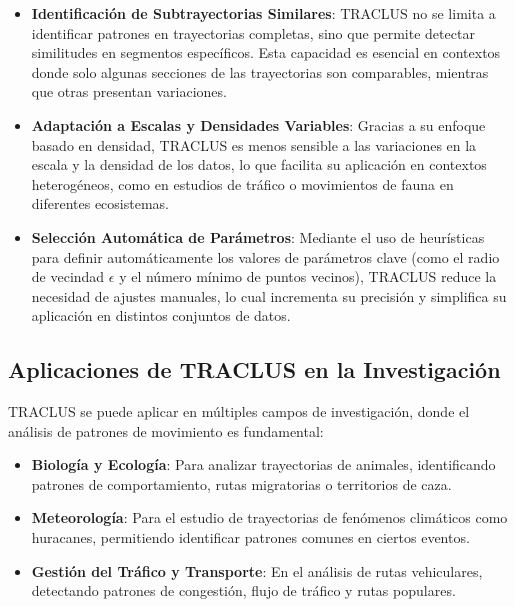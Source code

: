 \begin{itemize}
    \item \textbf{Identificación de Subtrayectorias Similares}: TRACLUS no se limita a identificar patrones en trayectorias completas, sino que permite detectar similitudes en segmentos específicos. Esta capacidad es esencial en contextos donde solo algunas secciones de las trayectorias son comparables, mientras que otras presentan variaciones.
    
    \item \textbf{Adaptación a Escalas y Densidades Variables}: Gracias a su enfoque basado en densidad, TRACLUS es menos sensible a las variaciones en la escala y la densidad de los datos, lo que facilita su aplicación en contextos heterogéneos, como en estudios de tráfico o movimientos de fauna en diferentes ecosistemas.
    
    \item \textbf{Selección Automática de Parámetros}: Mediante el uso de heurísticas para definir automáticamente los valores de parámetros clave (como el radio de vecindad $\epsilon$ y el número mínimo de puntos vecinos), TRACLUS reduce la necesidad de ajustes manuales, lo cual incrementa su precisión y simplifica su aplicación en distintos conjuntos de datos.
\end{itemize}

\subsection*{Aplicaciones de TRACLUS en la Investigación}
TRACLUS se puede aplicar en múltiples campos de investigación, donde el análisis de patrones de movimiento es fundamental:

\begin{itemize}
    \item \textbf{Biología y Ecología}: Para analizar trayectorias de animales, identificando patrones de comportamiento, rutas migratorias o territorios de caza.
    
    \item \textbf{Meteorología}: Para el estudio de trayectorias de fenómenos climáticos como huracanes, permitiendo identificar patrones comunes en ciertos eventos.
    
    \item \textbf{Gestión del Tráfico y Transporte}: En el análisis de rutas vehiculares, detectando patrones de congestión, flujo de tráfico y rutas populares.
\end{itemize}

